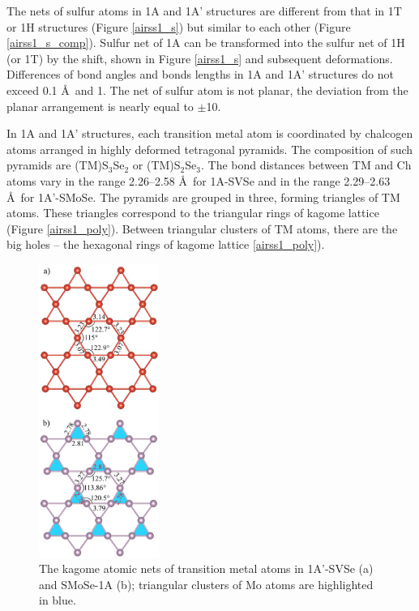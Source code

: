 \documentclass[a4paperm]{article}
\begin{document}
The nets of sulfur atoms in 1A and 1A' structures are different from that in 1T or 1H structures (Figure \ref{airss1_s}) but similar to each other (Figure \ref{airss1_s_comp}).
Sulfur net of 1A can be transformed into the sulfur net of 1H (or 1T) by the shift, shown in Figure \ref{airss1_s} and subsequent deformations.
Differences of bond angles and bonds lengths in 1A and 1A' structures do not exceed 0.1 \AA\ and 1\textdegree.
The net of sulfur atom is not planar, the deviation from the planar arrangement is nearly equal to $\pm$10\textdegree.

In 1A and 1A' structures, each transition metal atom is coordinated by chalcogen atoms arranged in highly deformed tetragonal pyramids.
The composition of such pyramids are (TM)S$_3$Se$_2$ or (TM)S$_2$Se$_3$.
The bond distances between TM and Ch atoms vary in the range 2.26--2.58 \AA\ for 1A-SVSe and in the range 2.29--2.63 \AA\ for 1A'-SMoSe.
The pyramids are grouped in three, forming triangles of TM atoms.
These triangles correspond to the triangular rings of kagome lattice (Figure \ref{airss1_poly}).
Between triangular clusters of TM atoms, there are the big holes -- the hexagonal rings of kagome lattice \ref{airss1_poly}).



\begin{figure}
	\includegraphics [width=0.35\textwidth]{airss1_tm.png}
	\caption{The kagome atomic nets of transition metal atoms in 1A'-SVSe (a) and SMoSe-1A (b); triangular clusters of Mo atoms are highlighted in blue.} 
\label{airss1_tm}
\end{figure}
\end{document}
